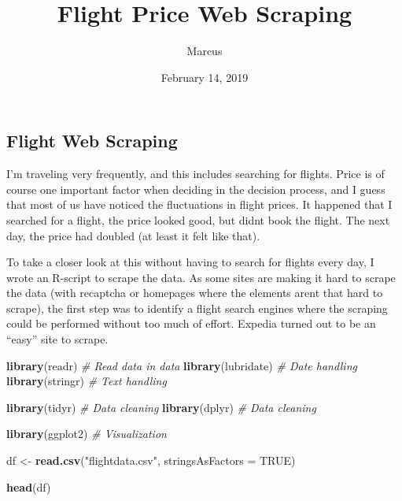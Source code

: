 \documentclass[]{article}
\title{Flight Price Web Scraping}
\author{Marcus}
\date{February 14, 2019}
\newenvironment{Shaded}{\begin{snugshade}}{\end{snugshade}}
\newcommand{\KeywordTok}[1]{\textcolor[rgb]{0.13,0.29,0.53}{\textbf{#1}}}
\newcommand{\DataTypeTok}[1]{\textcolor[rgb]{0.13,0.29,0.53}{#1}}
\newcommand{\StringTok}[1]{\textcolor[rgb]{0.31,0.60,0.02}{#1}}
\newcommand{\CommentTok}[1]{\textcolor[rgb]{0.56,0.35,0.01}{\textit{#1}}}
\newcommand{\OtherTok}[1]{\textcolor[rgb]{0.56,0.35,0.01}{#1}}
\newcommand{\NormalTok}[1]{#1}
\begin{document}
\maketitle

\subsection{Flight Web Scraping}\label{flight-web-scraping}

I'm traveling very frequently, and this includes searching for flights.
Price is of course one important factor when deciding in the decision
process, and I guess that most of us have noticed the fluctuations in
flight prices. It happened that I searched for a flight, the price
looked good, but didnt book the flight. The next day, the price had
doubled (at least it felt like that).

To take a closer look at this without having to search for flights every
day, I wrote an R-script to scrape the data. As some sites are making it
hard to scrape the data (with recaptcha or homepages where the elements
arent that hard to scrape), the first step was to identify a flight
search engines where the scraping could be performed without too much of
effort. Expedia turned out to be an ``easy'' site to scrape.

\begin{Shaded}
\begin{Highlighting}[]
\KeywordTok{library}\NormalTok{(readr)      }\CommentTok{# Read data in data }
\KeywordTok{library}\NormalTok{(lubridate)  }\CommentTok{# Date handling}
\KeywordTok{library}\NormalTok{(stringr)    }\CommentTok{# Text handling}

\KeywordTok{library}\NormalTok{(tidyr)      }\CommentTok{# Data cleaning}
\KeywordTok{library}\NormalTok{(dplyr)      }\CommentTok{# Data cleaning}

\KeywordTok{library}\NormalTok{(ggplot2)    }\CommentTok{# Visualization}

\NormalTok{df <-}\StringTok{ }\KeywordTok{read.csv}\NormalTok{(}\StringTok{"flightdata.csv"}\NormalTok{, }\DataTypeTok{stringsAsFactors =} \OtherTok{TRUE}\NormalTok{)}

\KeywordTok{head}\NormalTok{(df)}
\end{Highlighting}
\end{Shaded}
\end{document}
